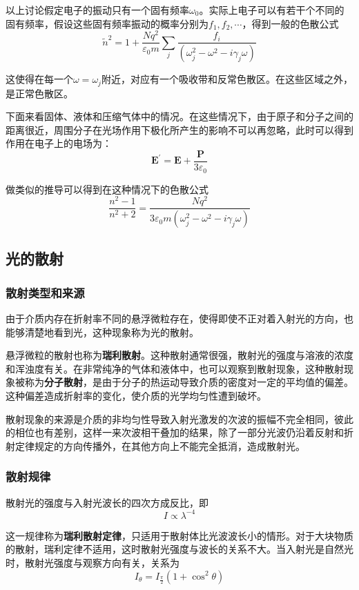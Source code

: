 \documentclass[UTF8]{ctexart}
\begin{document}
	以上讨论假定电子的振动只有一个固有频率$ \omega_{0} $。实际上电子可以有若干个不同的固有频率，假设这些固有频率振动的概率分别为$ f_{1}, f_{2}, \cdots $，得到一般的色散公式
	\begin{equation}
		\tilde{n}^{2} = 1+ \frac{N q^{2}}{\varepsilon_{0} m} \sum_{j} \frac{f_{i}}{\left(\omega_{j}^{2} - \omega^{2} - i \gamma_{j} \omega\right)}
	\end{equation}
	
	这使得在每一个$ \omega = \omega_{j} $附近，对应有一个吸收带和反常色散区。在这些区域之外，是正常色散区。
	
	下面来看固体、液体和压缩气体中的情况。在这些情况下，由于原子和分子之间的距离很近，周围分子在光场作用下极化所产生的影响不可以再忽略，此时可以得到作用在电子上的电场为：
	\begin{equation}
		\boldsymbol{E}^{\prime} = \boldsymbol{E} + \frac{\boldsymbol{P}}{3 \varepsilon_{0}}
	\end{equation}
	
\noindent 做类似的推导可以得到在这种情况下的色散公式
\begin{equation}
	\frac{n^{2}-1}{n^{2}+2} = \frac{N q^{2}}{3 \varepsilon_{0} m \left(\omega_{j}^{2} - \omega^{2} - i \gamma_{j} \omega\right)}
\end{equation}

	\subsection{光的散射}
	\subsubsection{散射类型和来源}
	由于介质内存在折射率不同的悬浮微粒存在，使得即使不正对着入射光的方向，也能够清楚地看到光，这种现象称为光的散射。
	
	悬浮微粒的散射也称为\textbf{瑞利散射}。这种散射通常很强，散射光的强度与溶液的浓度和浑浊度有关。在非常纯净的气体和液体中，也可以观察到散射现象，这种散射现象被称为\textbf{分子散射}，是由于分子的热运动导致介质的密度对一定的平均值的偏差。这种偏差造成折射率的变化，使介质的光学均匀性遭到破坏。
	
	散射现象的来源是介质的非均匀性导致入射光激发的次波的振幅不完全相同，彼此的相位也有差别，这样一来次波相干叠加的结果，除了一部分光波仍沿着反射和折射定律规定的方向传播外，在其他方向上不能完全抵消，造成散射光。
	
	\subsubsection{散射规律}
	散射光的强度与入射光波长的四次方成反比，即
	\begin{equation}
		I \propto \lambda^{-4}
	\end{equation}
	
\noindent 这一规律称为\textbf{瑞利散射定律}，只适用于散射体比光波波长小的情形。对于大块物质的散射，瑞利定律不适用，这时散射光强度与波长的关系不大。当入射光是自然光时，散射光强度与观察方向有关，关系为
\begin{equation}
	I_{\theta} = I_{\frac{\pi}{2}} \left( 1 + \cos^{2} \theta\right)
\end{equation}
\end{document}
